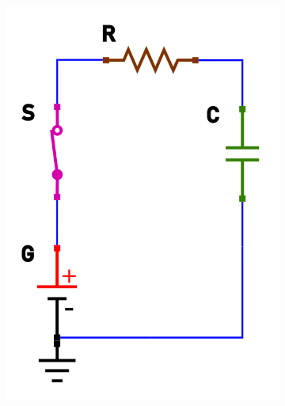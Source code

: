 \documentclass{article}
\begin{document}
\begin{figure}[h!]
\begin{subfigure}[b]{0.3\linewidth}
    \includegraphics[width=\linewidth]{data/carica-closed.png}
  \end{subfigure}
  \begin{subfigure}[b]{0.347\linewidth}

\end{subfigure}
\end{figure}
\end{document}
